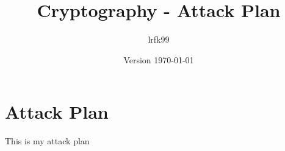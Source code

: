 \documentclass[a4paper, 11pt]{article}
\title{Cryptography - Attack Plan}
\date{Version \today}
\author{lrfk99}
\begin{document}
\maketitle

\section{Attack Plan}

This is my attack plan
\end{document}
